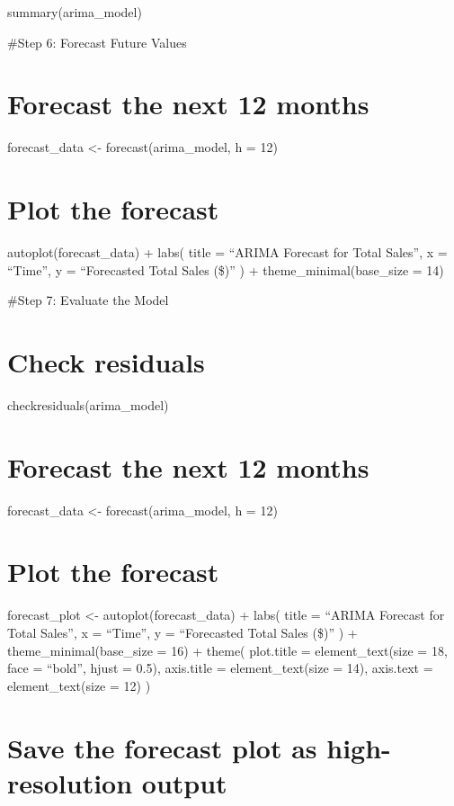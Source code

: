 \documentclass[
]{article}
\begin{document}
summary(arima\_model)

\#Step 6: Forecast Future Values

\section{Forecast the next 12 months}\label{forecast-the-next-12-months}

forecast\_data \textless- forecast(arima\_model, h = 12)

\section{Plot the forecast}\label{plot-the-forecast}

autoplot(forecast\_data) + labs( title = ``ARIMA Forecast for Total
Sales'', x = ``Time'', y = ``Forecasted Total Sales (\$)'' ) +
theme\_minimal(base\_size = 14)

\#Step 7: Evaluate the Model

\section{Check residuals}\label{check-residuals}

checkresiduals(arima\_model)

\section{Forecast the next 12
months}\label{forecast-the-next-12-months-1}

forecast\_data \textless- forecast(arima\_model, h = 12)

\section{Plot the forecast}\label{plot-the-forecast-1}

forecast\_plot \textless- autoplot(forecast\_data) + labs( title =
``ARIMA Forecast for Total Sales'', x = ``Time'', y = ``Forecasted Total
Sales (\$)'' ) + theme\_minimal(base\_size = 16) + theme( plot.title =
element\_text(size = 18, face = ``bold'', hjust = 0.5), axis.title =
element\_text(size = 14), axis.text = element\_text(size = 12) )

\section{Save the forecast plot as high-resolution
output}\label{save-the-forecast-plot-as-high-resolution-output}
\end{document}

